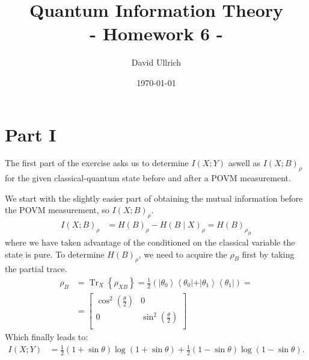 \documentclass[10]{article}
\title{Quantum Information Theory \\ - Homework 6 -\\ }
\author{David Ullrich}
\date{\today}
\begin{document}
\maketitle
\section*{Part I}
The first part of the exercise asks us to determine $I(X ; Y)$ aswell as $I(X ; B)_\rho$ for the given classical-quantum state before and after a POVM measurement.
\vspace{0.3cm}

We start with the slightly easier part of obtaining the mutual information before the POVM measurement, so $I(X ; B)_\rho$.
$$
\begin{aligned}
I(X ; B)_{\rho} & =H(B)_{\rho}-H(B \mid X)_{\rho}=H(B)_{\rho_{B}}
\end{aligned}
$$
where we have taken advantage of the conditioned on the classical variable the state is pure.
To determine $H(B)_{\rho}$, we need to acquire the $\rho_B$ first by taking the partial trace.
$$
\begin{aligned}
\rho_{B} & =\operatorname{Tr}_{X}\left\{\rho_{X B}\right\}=\frac{1}{2}\left(\left|\theta_{0}\right\rangle\left\langle\theta_{0}|+| \theta_{1}\right\rangle\left\langle\theta_{1}\right|\right)= \\
& =
    \begin{bmatrix}
        \cos ^{2}\left(\frac{\theta}{2}\right) & 0 \\
        0 & \sin ^{2}\left(\frac{\theta}{2}\right) \\
    \end{bmatrix}
\end{aligned}
$$
Which finally leads to:
$$
\begin{aligned}
I(X ; Y) & =\frac{1}{2}(1+\sin \theta) \log (1+\sin \theta)+\frac{1}{2}(1-\sin \theta) \log (1-\sin \theta) .
\end{aligned}
$$
\end{document}
